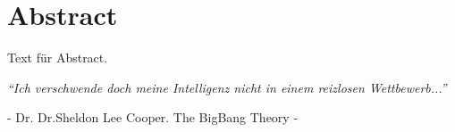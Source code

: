 %
%
\chapter{Abstract}

Text für Abstract.

\begin{center}
    {\itshape ``Ich verschwende doch meine Intelligenz nicht in einem reizlosen Wettbewerb...''}
    
    - Dr. Dr.Sheldon Lee Cooper. The BigBang Theory -
\end{center}

\newpage
